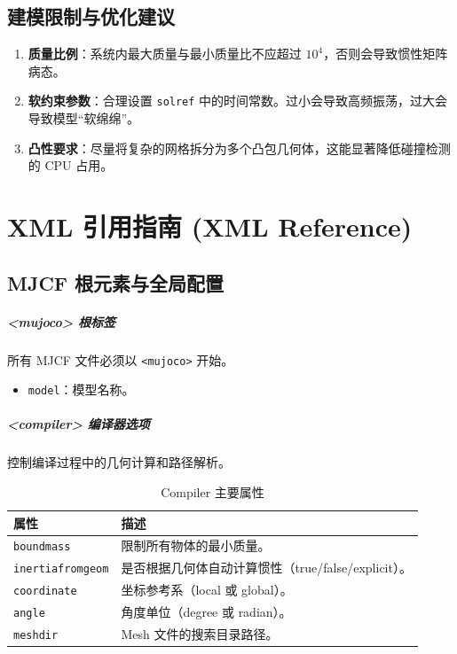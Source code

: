 \documentclass[11pt,a4paper]{book}
\begin{document}
\section{建模限制与优化建议}
\begin{enumerate}
    \item \textbf{质量比例}：系统内最大质量与最小质量比不应超过 $10^4$，否则会导致惯性矩阵病态。
    \item \textbf{软约束参数}：合理设置 \texttt{solref} 中的时间常数。过小会导致高频振荡，过大会导致模型“软绵绵”。
    \item \textbf{凸性要求}：尽量将复杂的网格拆分为多个凸包几何体，这能显著降低碰撞检测的 CPU 占用。
\end{enumerate}


\chapter{XML 引用指南 (XML Reference)}

\section{MJCF 根元素与全局配置}

\paragraph{<mujoco> 根标签}
所有 MJCF 文件必须以 \texttt{<mujoco>} 开始。
\begin{itemize}
    \item \texttt{model}：模型名称。
\end{itemize}

\paragraph{<compiler> 编译器选项}
控制编译过程中的几何计算和路径解析。
\begin{longtable}{lp{12cm}}
\caption{Compiler 主要属性} \\
\toprule
\textbf{属性} & \textbf{描述} \\ \midrule
\texttt{boundmass} & 限制所有物体的最小质量。 \\
\texttt{inertiafromgeom} & 是否根据几何体自动计算惯性（true/false/explicit）。 \\
\texttt{coordinate} & 坐标参考系（local 或 global）。 \\
\texttt{angle} & 角度单位（degree 或 radian）。 \\
\texttt{meshdir} & Mesh 文件的搜索目录路径。 \\
\bottomrule
\end{longtable}
\end{document}
